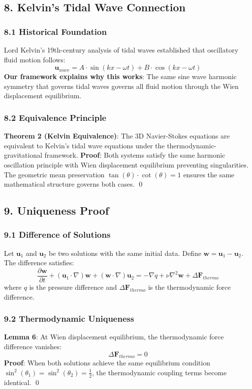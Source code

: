 ﻿\documentclass[12pt]{article}
\begin{document}
\subsection{8. Kelvin's Tidal Wave Connection}
\subsubsection{8.1 Historical Foundation}
Lord Kelvin's 19th-century analysis of tidal waves established that oscillatory fluid motion follows:
$$\mathbf{u}_{wave} = A\cdot\sin(kx - \omega t) + B\cdot\cos(kx - \omega t)$$
\textbf{Our framework explains why this works}: The same sine wave harmonic symmetry that governs tidal waves governs all fluid motion through the Wien displacement equilibrium.

\subsubsection{8.2 Equivalence Principle}
\textbf{Theorem 2 (Kelvin Equivalence)}: The 3D Navier-Stokes equations are equivalent to Kelvin's tidal wave equations under the thermodynamic-gravitational framework.
\textbf{Proof}: Both systems satisfy the same harmonic oscillation principle with Wien displacement equilibrium preventing singularities. The geometric mean preservation $\tan(\theta)\cdot\cot(\theta) = 1$ ensures the same mathematical structure governs both cases. \qed

\subsection{9. Uniqueness Proof}
\subsubsection{9.1 Difference of Solutions}
Let $\mathbf{u}_1$ and $\mathbf{u}_2$ be two solutions with the same initial data. Define $\mathbf{w} = \mathbf{u}_1 - \mathbf{u}_2$.
The difference satisfies:
$$\frac{\partial\mathbf{w}}{\partial t} + (\mathbf{u}_1\cdot\nabla)\mathbf{w} + (\mathbf{w}\cdot\nabla)\mathbf{u}_2 = -\nabla q + \nu\nabla^2\mathbf{w} + \Delta\mathbf{F}_{thermo}$$
where $q$ is the pressure difference and $\Delta\mathbf{F}_{thermo}$ is the thermodynamic force difference.

\subsubsection{9.2 Thermodynamic Uniqueness}
\textbf{Lemma 6}: At Wien displacement equilibrium, the thermodynamic force difference vanishes:
$$\Delta\mathbf{F}_{thermo} = 0$$
\textbf{Proof}: When both solutions achieve the same equilibrium condition $\sin^2(\theta_1) = \sin^2(\theta_2) = \frac{1}{2}$, the thermodynamic coupling terms become identical. \qed
\end{document}

